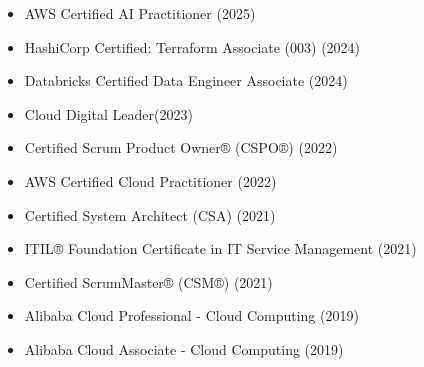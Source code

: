 

\begin{itemize}
    \item AWS Certified AI Practitioner (2025)
    \item HashiCorp Certified: Terraform Associate (003) (2024)
    \item Databricks Certified Data Engineer Associate (2024)
    \item Cloud Digital Leader(2023)
    \item Certified Scrum Product Owner® (CSPO®) (2022)
    \item AWS Certified Cloud Practitioner (2022)
    \item Certified System Architect (CSA) (2021)
    \item ITIL® Foundation Certificate in IT Service Management (2021)
    \item Certified ScrumMaster® (CSM®) (2021)
    \item Alibaba Cloud Professional - Cloud Computing (2019)
    \item Alibaba Cloud Associate - Cloud Computing (2019)
\end{itemize}

\vspace{4pt} 